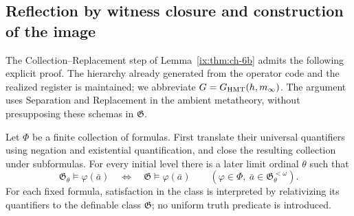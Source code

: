 \subsection{Reflection by witness closure and construction of the image}
\label{empalme:reflexion-testigos}
The Collection--Replacement step of Lemma~\ref{ix:thm:ch-6b} admits the following
explicit proof. The hierarchy already generated from the
operator code and the realized register is maintained; we abbreviate
\(\mathfrak G=\mathfrak G_{\rm HMT}(h,m_\infty)\).
The argument uses Separation and Replacement in the ambient metatheory,
without presupposing these schemas in \(\mathfrak G\).

Let \(\Phi\) be a finite collection of formulas. First translate their
universal quantifiers using negation and existential quantification, and
close the resulting collection under subformulas. For every initial level
there is a later limit ordinal \(\theta\) such that
\[
 \mathfrak G_\theta\models\varphi(\bar a)
 \quad\Longleftrightarrow\quad
 \mathfrak G\models\varphi(\bar a)
 \qquad
 (\varphi\in\Phi,\ \bar a\in\mathfrak G_\theta^{<\omega}).
\]
For each fixed formula, satisfaction in the class is interpreted by
relativizing its quantifiers to the definable class \(\mathfrak G\);
no uniform truth predicate is introduced.


